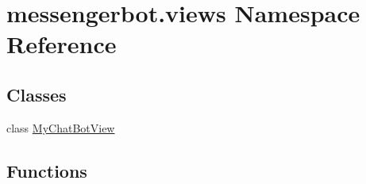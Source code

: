 \hypertarget{namespacemessengerbot_1_1views}{}\section{messengerbot.\+views Namespace Reference}
\label{namespacemessengerbot_1_1views}
\subsection*{Classes}
\begin{DoxyCompactItemize}
\item 
class \hyperlink{classmessengerbot_1_1views_1_1MyChatBotView}{My\+Chat\+Bot\+View}
\end{DoxyCompactItemize}
\subsection*{Functions}
